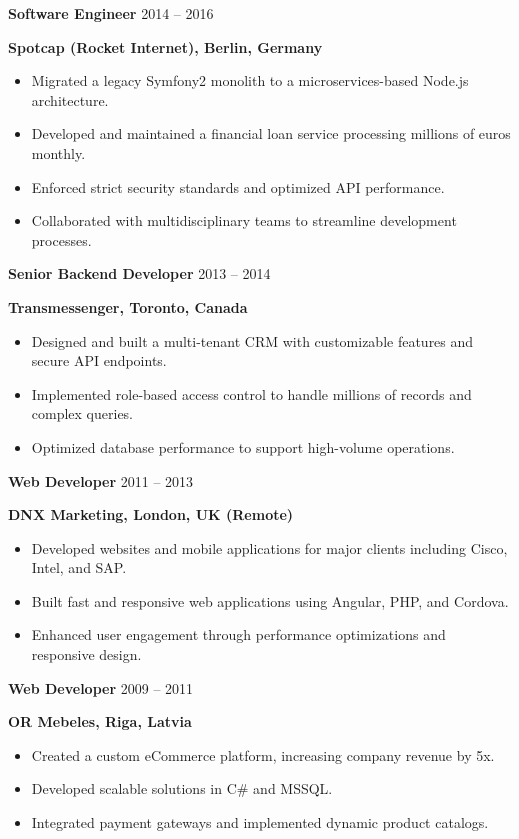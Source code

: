\documentclass[a4paper,10pt]{article}
\begin{document}
\textbf{Software Engineer} \hfill 2014 -- 2016 \par
\textbf{Spotcap (Rocket Internet), Berlin, Germany} \par
\begin{itemize}[noitemsep,topsep=0pt]
    \item Migrated a legacy Symfony2 monolith to a microservices-based Node.js architecture.
    \item Developed and maintained a financial loan service processing millions of euros monthly.
    \item Enforced strict security standards and optimized API performance.
    \item Collaborated with multidisciplinary teams to streamline development processes.
\end{itemize}
\vspace{6pt}

\textbf{Senior Backend Developer} \hfill 2013 -- 2014 \par
\textbf{Transmessenger, Toronto, Canada} \par
\begin{itemize}[noitemsep,topsep=0pt]
    \item Designed and built a multi-tenant CRM with customizable features and secure API endpoints.
    \item Implemented role-based access control to handle millions of records and complex queries.
    \item Optimized database performance to support high-volume operations.
\end{itemize}
\vspace{6pt}

\textbf{Web Developer} \hfill 2011 -- 2013 \par
\textbf{DNX Marketing, London, UK (Remote)} \par
\begin{itemize}[noitemsep,topsep=0pt]
    \item Developed websites and mobile applications for major clients including Cisco, Intel, and SAP.
    \item Built fast and responsive web applications using Angular, PHP, and Cordova.
    \item Enhanced user engagement through performance optimizations and responsive design.
\end{itemize}
\vspace{6pt}

\textbf{Web Developer} \hfill 2009 -- 2011 \par
\textbf{OR Mebeles, Riga, Latvia} \par
\begin{itemize}[noitemsep,topsep=0pt]
    \item Created a custom eCommerce platform, increasing company revenue by 5x.
    \item Developed scalable solutions in C\# and MSSQL.
    \item Integrated payment gateways and implemented dynamic product catalogs.
\end{itemize}
\vspace{6pt}
\end{document}
